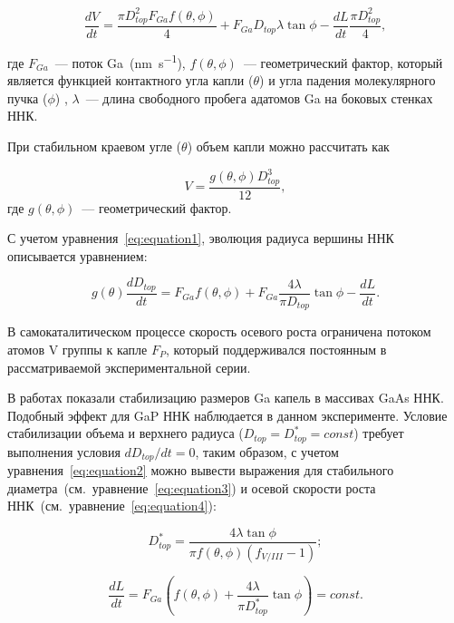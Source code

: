 \begin{equation}
	\label{eq:equation1}
	\frac{dV}{dt}=\frac{\pi D_{top}^2 F_{Ga} f(\theta,\phi)}{4}+F_{Ga} D_{top} \lambda \tan{\phi} - \frac{dL}{dt} \frac{\pi D_{top}^2}{4},
\end{equation}

где \(F_{Ga}\)~--- поток Ga~(\si{\nano\meter\per\second}), \(f(\theta,\phi)\)~--- геометрический фактор, который является функцией контактного угла капли (\(\theta\)) и угла падения молекулярного пучка (\(\phi\)) \cite{glas2010vapor}, \(\lambda\)~--- длина свободного пробега адатомов Ga на боковых стенках ННК. 

При стабильном краевом угле (\(\theta\)) объем капли можно рассчитать как

\begin{equation}
	\label{eq:equation7}
	 V=\frac{g(\theta,\phi)D_{top}^3}{12},
\end{equation}
где \(g(\theta,\phi)\)~--- геометрический фактор.

С учетом уравнения~\ref{eq:equation1}, эволюция радиуса вершины ННК описывается уравнением:

\begin{equation}
	\label{eq:equation2}
	g(\theta) \frac{dD_{top}}{dt}=F_{Ga} f(\theta,\phi)+ F_{Ga} \frac{4 \lambda}{\pi D_{top}} \tan{\phi}-\frac{dL}{dt}.
\end{equation}

В самокаталитическом процессе скорость осевого роста ограничена потоком атомов V группы к капле \(F_P\), который поддерживался постоянным в рассматриваемой экспериментальной серии.

В работах \cite{tersoff2015stable,dubrovskii2016regimes,berdnikov2020comparison} показали стабилизацию размеров Ga капель в массивах GaAs ННК. Подобный эффект для GaP ННК наблюдается в данном эксперименте. Условие стабилизации объема и верхнего радиуса (\(D_{top} = D_{top}^\ast = const\)) требует выполнения условия \(dD_{top} / dt = 0\), таким образом, с учетом уравнения~\ref{eq:equation2} можно вывести выражения для стабильного диаметра~(см.~уравнение~\ref{eq:equation3}) и осевой скорости роста ННК~(см.~уравнение~\ref{eq:equation4}):

\begin{equation}
	\label{eq:equation3}
	D_{top}^\ast=\frac{4 \lambda \tan{\phi}}{\pi f(\theta,\phi)(f_{V/III}-1)};
\end{equation}

\begin{equation}
	\label{eq:equation4}
	\frac{dL}{dt}=F_{Ga} \left( f(\theta,\phi) + \frac{4 \lambda}{\pi D_{top}^\ast}\tan{\phi} \right)=const.
\end{equation}

